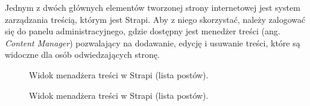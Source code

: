 \documentclass[a4paper, 12pt]{article}
\numberwithin{figure}{section}
\begin{document}
\begin{sloppypar}
Jednym z dwóch głównych elementów tworzonej strony internetowej jest system zarządzania treścią, którym jest Strapi. Aby z niego skorzystać, należy zalogować się do panelu administracyjnego, gdzie dostępny jest menedżer treści (ang. \textit{Content Manager}) pozwalający na dodawanie, edycję i usuwanie treści, które są widoczne dla osób odwiedzających stronę. 

\begin{figure}[H] 
    \centering
   \caption{Widok menadżera treści w Strapi (lista postów).}
   \label{fig:strapi-use-1.jpg}
\end{figure}

\begin{figure}[H] 
    \centering
   \caption{Widok menadżera treści w Strapi (lista postów).}
   \label{fig:strapi-use-2.jpg}
\end{figure}


\end{sloppypar}
\end{document}
